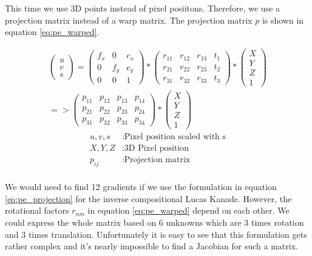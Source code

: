 \documentclass[11pt,a4paper,titlepage,oneside]{report}
\begin{document}
This time we use 3D points instead of pixel posiitons. Therefore, we use a projection matrix instead of a warp matrix. The projection matrix $p$ is shown in equation \ref{eq:pe_warped}. 

\begin{equation}\label{eq:pe_warped}
  \begin{split}
  \begin{pmatrix}
    u \\
    v \\
    s
  \end{pmatrix}=
  \begin{pmatrix}
    f_x & 0 & c_x \\
    0 & f_y & c_y \\
    0 & 0 & 1
  \end{pmatrix}*
  \begin{pmatrix}
    r_{11} & r_{12} & r_{13} & t_{1} \\
    r_{21} & r_{22} & r_{23} & t_{2} \\
    r_{31} & r_{32} & r_{33} & t_{3}
  \end{pmatrix}*
  \begin{pmatrix}
    X\\
    Y\\
    Z\\
    1
  \end{pmatrix}\\
  =>\begin{pmatrix}
    p_{11} & p_{12} & p_{13} & p_{14} \\
    p_{21} & p_{22} & p_{23} & p_{24} \\
    p_{31} & p_{32} & p_{33} & p_{34}
  \end{pmatrix}*
  \begin{pmatrix}
    X\\
    Y\\
    Z\\
    1
  \end{pmatrix}
\end{split}
\end{equation}
\begin{align*}
  u,v,s      &:  \text{Pixel position scaled with s}\\
  X,Y,Z      &:  \text{3D Pixel position}\\
  p_{ij}    &:  \text{Projection matrix}\\
\end{align*}

We would need to find 12 gradients if we use the formulation in equation \ref{eq:pe_projection} for the inverse compositional Lucas Kanade. However, the rotational factors $r_{nm}$ in equation \ref{eq:pe_warped} depend on each other. We could express the whole matrix based on 6 unknowns which are 3 times rotation and 3 times translation. Unfortunately it is easy to see that this formulation gets rather complex and it's nearly impossible to find a Jacobian for such a matrix.\\
\end{document}
